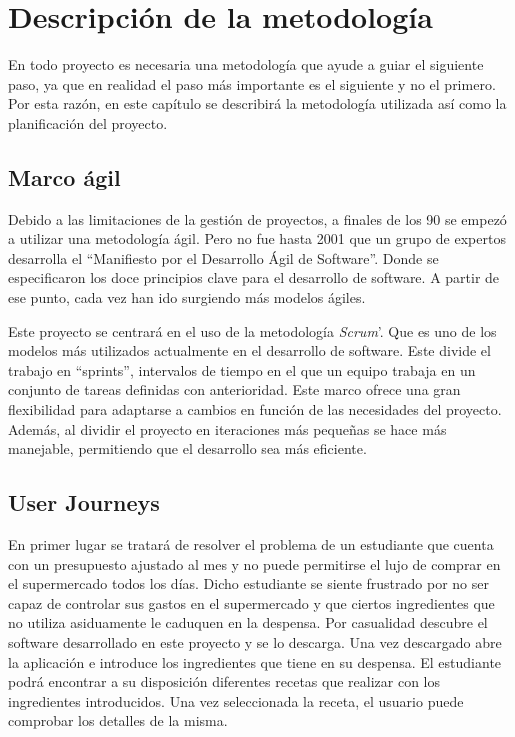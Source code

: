 \chapter{Descripción de la metodología}
En todo proyecto es necesaria una metodología que ayude a guiar el siguiente paso, ya que en realidad el paso más importante es el siguiente y no el primero. Por esta razón, en este capítulo se describirá la metodología utilizada así como la planificación del proyecto.

\section{Marco ágil}
Debido a las limitaciones de la gestión de proyectos, a finales de los 90 se empezó a utilizar una metodología ágil. Pero no fue hasta 2001 que un grupo de expertos desarrolla el ``Manifiesto por el Desarrollo Ágil de Software''. Donde se especificaron los doce principios clave para el desarrollo de software. A partir de ese punto, cada vez han ido surgiendo más modelos ágiles.

Este proyecto se centrará en el uso de la metodología \emph{Scrum}'. Que es uno de los modelos más utilizados actualmente en el desarrollo de software. Este divide el trabajo en ``sprints'', intervalos de tiempo en el que un equipo trabaja en un conjunto de tareas definidas con anterioridad. Este marco ofrece una gran flexibilidad para adaptarse a cambios en función de las necesidades del proyecto. Además, al dividir el proyecto en iteraciones más pequeñas se hace más manejable, permitiendo que el desarrollo sea más eficiente.

\section{User Journeys}

En primer lugar se tratará de resolver el problema de un estudiante que cuenta con un presupuesto ajustado al mes y no puede permitirse el lujo de comprar en el supermercado todos los días. Dicho estudiante se siente frustrado por no ser capaz de controlar sus gastos en el supermercado y que ciertos ingredientes que no utiliza asiduamente le caduquen en la despensa. Por casualidad descubre el software desarrollado en este proyecto y se lo descarga. Una vez descargado abre la aplicación e introduce los ingredientes que tiene en su despensa. El estudiante podrá encontrar a su disposición diferentes recetas que realizar con los ingredientes introducidos. Una vez seleccionada la receta, el usuario puede comprobar los detalles de la misma.

